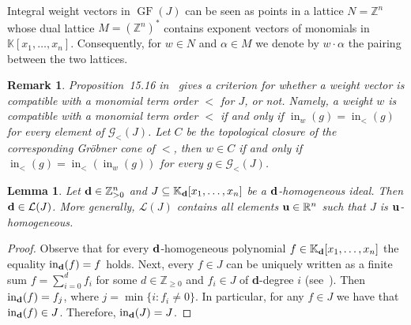 \documentclass[10pt,a4paper]{amsart}
\newcommand{\thlabel}[1]{\label{#1}}
\newtheorem{Lemma}[Theorem]{Lemma}
\newtheorem{Remark}[Theorem]{Remark}}
\numberwithin{equation}{section}
\DeclareMathOperator{\init}{in}
\DeclareMathOperator{\GF}{GF}
\begin{document}
Integral weight vectors in $\GF(J)$ can be seen as points in a lattice $N=\mathbb Z^n$ whose dual lattice $M=(\mathbb Z^n)^*$ contains exponent vectors of monomials in $\mathbb K[x_1,\dots,x_n]$.
Consequently, for $w\in N$ and $\alpha\in M$ we denote by $w\cdot \alpha$ the pairing between the two lattices.

\begin{Remark}\label{rem:Eisenbud}
Proposition~15.16 in~\cite{eisenbud2013commutative} gives a criterion for whether a weight vector is compatible with a monomial term order $<$ for $J$, or not. Namely, a weight $w$ is compatible with a monomial term order $<$ if and only if $\init_w(g)=\init_{<}(g)$ for every element of $\mathcal{G}_<(J)$. Let $C$ be the topological closure of the corresponding Gr\"obner cone of $<$, then $w\in C$ if and only if $\init_<(g)=\init_<(\init_w(g))$ for every $g\in \mathcal{G}_<(J)$.
\end{Remark}

\begin{Lemma}\thlabel{lem:wt homog}
Let ${\bf d}\in \mathbb Z_{>0}^n$ and $J\subseteq \mathbb K_{\bf d}[x_1, \dots , x_n]$ be a ${\bf d}$-homogeneous ideal. Then ${\bf d} \in \mathcal{L}(J)$.
More generally, $\mathcal L(J)$ contains all elements ${\bf u}\in \mathbb R^n$ such that $J$ is ${\bf u}$-homogeneous.
\end{Lemma}
\begin{proof}
Observe that for every ${\bf d}$-homogeneous polynomial $f\in \mathbb K_{\bf d}[x_1, \dots , x_n]$ the equality $\init_{\bf d}(f)=f$ holds.
Next, every $f \in J$ can be uniquely written as a finite sum $f=\sum_{i=0}^{d} f_i$ for some $d\in \mathbb Z_{\geq 0}$ and $f_i\in J$ of {\bf d}-degree $i$ (see~\cite[Lemma~3.0.7]{Hosgood}).
Then $\init_{\bf d}(f)=f_j$, where $j=\min\{ i \colon f_i \neq 0\} $.
In particular, for any $f \in J $ we have that $\init_{\bf d}(f) \in J$.
Therefore, $\init_{\bf d}(J )= J$.
\end{proof}
\end{document}
